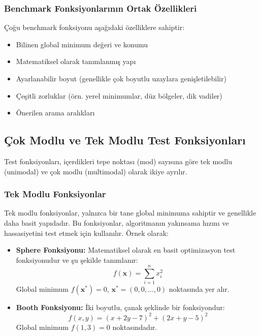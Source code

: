 \subsubsection{Benchmark Fonksiyonlarının Ortak Özellikleri}

Çoğu benchmark fonksiyonu aşağıdaki özelliklere sahiptir:

\begin{itemize}
    \item Bilinen global minimum değeri ve konumu
    \item Matematiksel olarak tanımlanmış yapı
    \item Ayarlanabilir boyut (genellikle çok boyutlu uzaylara genişletilebilir)
    \item Çeşitli zorluklar (örn. yerel minimumlar, düz bölgeler, dik vadiler)
    \item Önerilen arama aralıkları
\end{itemize}

\subsection{Çok Modlu ve Tek Modlu Test Fonksiyonları}

Test fonksiyonları, içerdikleri tepe noktası (mod) sayısına göre tek modlu (unimodal) ve çok modlu (multimodal) olarak ikiye ayrılır.

\subsubsection{Tek Modlu Fonksiyonlar}

Tek modlu fonksiyonlar, yalnızca bir tane global minimuma sahiptir ve genellikle daha basit yapıdadır. Bu fonksiyonlar, algoritmanın yakınsama hızını ve hassasiyetini test etmek için kullanılır. Örnek olarak:

\begin{itemize}
    \item \textbf{Sphere Fonksiyonu:} Matematiksel olarak en basit optimizasyon test fonksiyonudur ve şu şekilde tanımlanır:
    \begin{equation}
        f(\mathbf{x}) = \sum_{i=1}^{n} x_i^2
    \end{equation}
    Global minimum $f(\mathbf{x}^*) = 0$, $\mathbf{x}^* = (0, 0, \ldots, 0)$ noktasında yer alır.
    
    \item \textbf{Booth Fonksiyonu:} İki boyutlu, çanak şeklinde bir fonksiyondur:
    \begin{equation}
        f(x, y) = (x + 2y - 7)^2 + (2x + y - 5)^2
    \end{equation}
    Global minimum $f(1, 3) = 0$ noktasındadır.
\end{itemize}

